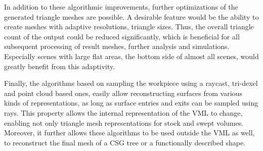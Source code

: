 In addition to these algorithmic improvements, further optimizations of the generated triangle meshes are possible.
A desirable feature would be the ability to create meshes with adaptive resolutions, \ie triangle sizes.
Thus, the overall triangle count of the output could be reduced significantly, which is beneficial for all subsequent processing of result meshes, \eg further analysis and simulations.
Especially scenes with large flat areas, \cf the bottom side of almost all scenes, would greatly benefit from this adaptivity.

Finally, the algorithms based on sampling the workpiece using a raycast, \ie tri-dexel and point cloud based ones, easily allow reconstructing surfaces from various kinds of representations, as long as surface entries and exits can be sampled using rays.
This property allows the internal representation of the VML to change, enabling not only triangle mesh representations for stock and swept volumes.
Moreover, it further allows these algorithms to be used outside the VML as well, \eg to reconstruct the final mesh of a CSG tree or a functionally described shape.
